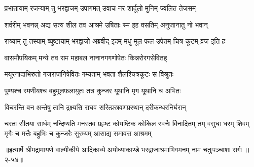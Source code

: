 \twolineshloka
{प्रभातायाम् रजन्याम् तु भरद्वाजम् उपागमत्}
{उवाच नर शार्दूलो मुनिम् ज्वलित तेजसम्} %

\twolineshloka
{शर्वरीम् भवनन्न् अद्य सत्य शील तव आश्रमे}
{उषिताः स्म इह वसतिम् अनुजानातु नो भवान्} %

\twolineshloka
{रात्र्याम् तु तस्याम् व्युष्टायाम् भरद्वाजो अब्रवीद् इदम्}
{मधु मूल फल उपेतम् चित्र कूटम् व्रज इति ह} %

\twolineshloka
{वासमौपयिकम् मन्ये तव राम महाबल}
{नानानगगणोपेतः किन्नरोरगसेवितह्} %

\twolineshloka
{मयूरनादाभिरुतो गजराजनिषेवितः}
{गम्यताम् भवता शैलश्चित्रकूटः स विश्रुतः} %

\twolineshloka
{पुण्यश्च रमणीयश्च बहुमूलफलायुतः}
{तत्र कुन्जर यूथानि मृग यूथानि च अभितः} %

\twolineshloka
{विचरन्ति वन अन्तेषु तानि द्रक्ष्यसि राघव}
{सरित्प्रस्रवणप्रस्थान् दरीकन्धरनिर्घरान्} %

\twolineshloka
{चरतः सीतया सार्धम् नन्दिष्यति मनस्तव}
{प्रहृष्ट कोयष्टिक कोकिल स्वनैः}
{र्विनादितम् तम् वसुधा धरम् शिवम्}
{मृगैः च मत्तैः बहुभिः च कुन्जरैः}
{सुरम्यम् आसाद्य समावस आश्रमम्} %


॥इत्यार्षे श्रीमद्रामायणे वाल्मीकीये आदिकाव्ये अयोध्याकाण्डे भरद्वाजाश्रमाभिगमनम् नाम चतुःपञ्चाशः सर्गः ॥२-५४॥
